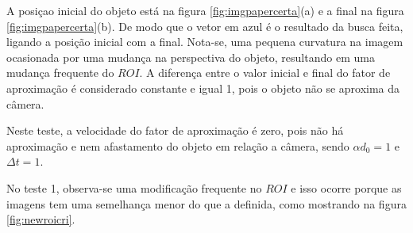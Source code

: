 A posiçao inicial do objeto está na figura \ref{fig:imgpapercerta}(a) 
e a final na figura \ref{fig:imgpapercerta}(b). De modo que o
vetor em azul é o resultado da busca feita, ligando a posição inicial com a final.
Nota-se, uma pequena curvatura na imagem ocasionada por uma mudança
na perspectiva do objeto, resultando em uma mudança frequente do $ROI$.
A diferença entre o valor inicial e final do fator de aproximação é considerado constante
e igual 1, pois o objeto não se aproxima da câmera.

Neste teste, a velocidade do fator de aproximação é zero, pois não há aproximação e nem
afastamento do objeto em relação a câmera, sendo $\alpha d_0=1$ e $\Delta t=1$.

No teste 1, observa-se uma modificação frequente no $ROI$ e isso ocorre porque as imagens 
tem uma semelhança menor do que a definida, como mostrando na figura \ref{fig:newroicri}.

